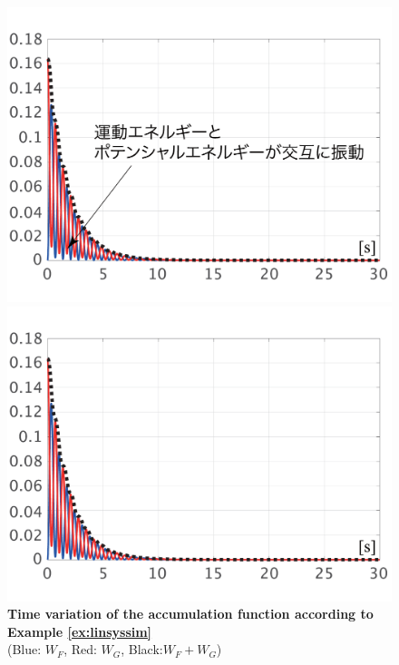 \documentclass[tombow,dvipdfmx]{corona-a5-1.1}
\begin{document}
\begin{figure}[t]
  \centering
  {
  \begin{minipage}{0.49\linewidth}
    \centering
    \includegraphics[width = 1.0\linewidth]{figs/losslessW}
    \medskip
  \end{minipage}
  \begin{minipage}{0.49\linewidth}
    \centering
    \includegraphics[width = 1.0\linewidth]{figs/lossyW}
    \medskip
  \end{minipage}
  }
  \medskip
  \caption{\textbf{Time variation of the accumulation function according to Example \ref{ex:linsyssim}}
  \\  \centering(Blue: $W_F$, Red: $W_G$, Black:$W_F+W_G$)}
  \label{fig:LyapW}
\medskip
\end{figure}
\end{document}

